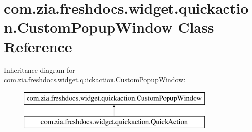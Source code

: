 \hypertarget{classcom_1_1zia_1_1freshdocs_1_1widget_1_1quickaction_1_1_custom_popup_window}{\section{com.\-zia.\-freshdocs.\-widget.\-quickaction.\-Custom\-Popup\-Window Class Reference}
\label{classcom_1_1zia_1_1freshdocs_1_1widget_1_1quickaction_1_1_custom_popup_window}
}
Inheritance diagram for com.\-zia.\-freshdocs.\-widget.\-quickaction.\-Custom\-Popup\-Window\-:\begin{figure}[H]
\begin{center}
\leavevmode
\includegraphics[height=2.000000cm]{classcom_1_1zia_1_1freshdocs_1_1widget_1_1quickaction_1_1_custom_popup_window}
\end{center}
\end{figure}
